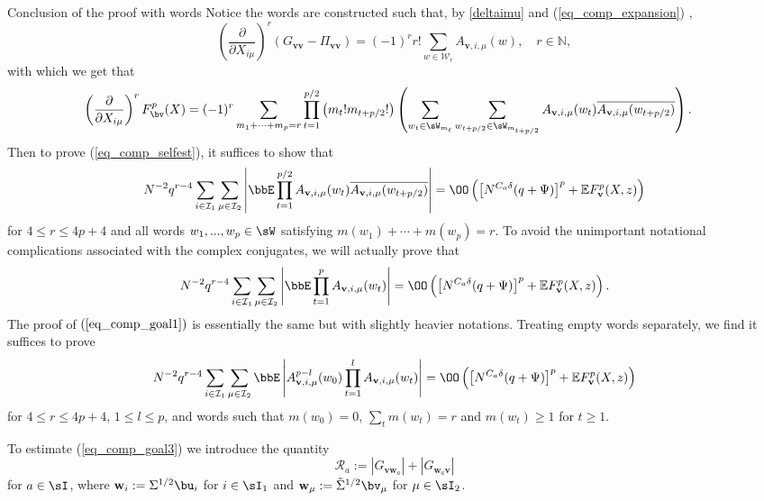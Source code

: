 \begin{subsection}{Conclusion of the proof with words}
Notice the words are constructed such that, by \eqref{deltaimu} and (\ref{eq_comp_expansion}) ,
\[\left(\frac{\partial}{\partial X_{i\mu}}\right)^r \left( G_{\mathbf v\mathbf v}-\Pi_{\mathbf v\mathbf v}\right)=(-1)^r r!\sum_{w\in \mathcal W_r} A_{\mathbf v, i, \mu}(w),\quad r\in \mathbb N,\]
with which we get that
\begin{align*}
\left(\frac{\partial}{\partial X_{i\mu}}\right)^r F_{\bv}^p(X)=(-1)^r & \sum_{m_1+\cdots+m_p=r}\prod_{t=1}^{p/2}\left(m_t! m_{t+p/2}!\right) \left(\sum_{w_t\in\sW_{m_t}}\sum_{w_{t+p/2}\in\sW_{m_{t+p/2}}}A_{\mathbf v, i, \mu}(w_t)\overline{A_{\mathbf v, i, \mu}(w_{t+p/2})}\right).
\end{align*}
Then to prove (\ref{eq_comp_selfest}), it suffices to show that
\begin{equation}
N^{-2}q^{r-4}\sum_{i\in\mathcal I_1}\sum_{\mu\in\mathcal I_2}\left|\bbE\prod_{t=1}^{p/2}A_{\mathbf v, i, \mu}(w_t)\overline{A_{\mathbf v, i, \mu}(w_{t+p/2})}\right|=\OO\left(\left[N^{C_a\delta} (q+\Psi)\right]^p+\mathbb EF_{\mathbf v}^p(X,z)\right)\label{eq_comp_goal1}
\end{equation}
for  $4\le r\le 4p+4$ and all words $w_1,...,w_p\in \sW$ satisfying $m(w_1)+\cdots+m(w_p)=r$.
To avoid the unimportant notational complications associated with the complex conjugates, we will actually prove that
\begin{equation}\label{eq_comp_goal2}
N^{-2}q^{r-4}\sum_{i\in\mathcal I_1}\sum_{\mu\in\mathcal I_2}\left|\bbE\prod_{t=1}^{p}A_{\mathbf v, i, \mu}(w_t)\right|=\OO\left(\left[N^{C_a\delta} (q+\Psi)\right]^p+\mathbb EF_{\mathbf v}^p(X,z)\right).
\end{equation}
The proof of $(\ref{eq_comp_goal1})$ is essentially the same but with slightly heavier notations. Treating empty words separately, we find it suffices to prove
\begin{equation}
\label{eq_comp_goal3}N^{-2}q^{r-4}\sum_{i\in\mathcal I_1}\sum_{\mu\in\mathcal I_2}\bbE\left|A^{p-l}_{\mathbf v, i, \mu}(w_0)\prod_{t=1}^{l}A_{\mathbf v, i, \mu}(w_t)\right|=\OO\left(\left[N^{C_a\delta} (q+\Psi)\right]^p+\mathbb EF_{\mathbf v}^p(X,z)\right)
\end{equation}
for  $4\le r\le 4p+4$, $1\le l \le p$, and words such that $m(w_0)=0$, $\sum_t m(w_t)=r$ and $m(w_t)\ge 1$ for $t\ge 1$.

To estimate (\ref{eq_comp_goal3}) we introduce the quantity
\begin{equation}\label{eq_comp_Rs}
\mathcal R_a:=|G_{\mathbf v \mathbf w_a}|+|G_{\mathbf w_a \mathbf v}|
\end{equation}
for $a\in \sI$, where $\mathbf w_i:= \Sigma^{1/2} \bu_i$ for $i\in\sI_1$ and $\mathbf w_\mu:=\tilde \Sigma^{1/2} \bv_\mu$ for $\mu\in\sI_2$.


\end{subsection}
